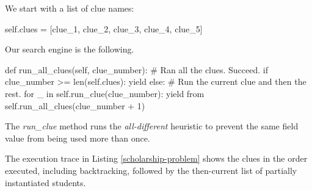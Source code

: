 We start with a list of clue names: 
\begin{center}
\begin{minipage}[c]{0.46\textwidth}
\begin{python1}
self.clues = [clue_1, clue_2, clue_3, clue_4, clue_5] 
\end{python1}
\end{minipage}
\end{center}
Our search engine is the following.

\begin{center}
\begin{minipage}[c]{0.45\textwidth}
\begin{python1}
def run_all_clues(self, clue_number):
  # Ran all the clues. Succeed.
  if clue_number >= len(self.clues): yield
  else:
    # Run the current clue and then the rest.
    for _ in self.run_clue(clue_number):
      yield from self.run_all_clues(clue_number + 1)
\end{python1}
\end{minipage}
\end{center}

The \textit{run\_clue} method runs the \textit{all-different} heuristic to prevent the same field value from being used more than once. 

The execution trace in Listing \ref{scholarship-problem} shows the clues in the order executed, including backtracking, followed by the then-current list of partially instantiated students.

